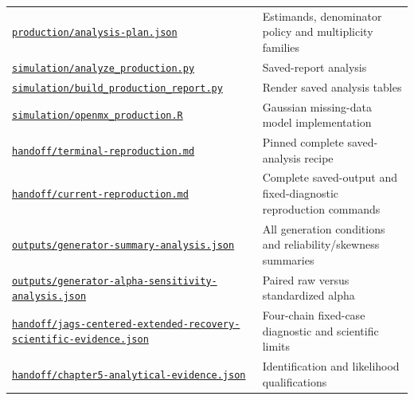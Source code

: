 \documentclass[11pt]{article}
\begin{document}
\begin{longtable}{p{225pt}p{220pt}}
\href{https://github.com/alectionary/vibe-math/blob/master/formalization/schwabe-psychometric-genetics/production/analysis-plan.json}{\nolinkurl{production/analysis-plan.json}} & Estimands, denominator policy and multiplicity families\\
\href{https://github.com/alectionary/vibe-math/blob/master/formalization/schwabe-psychometric-genetics/simulation/analyze_production.py}{\nolinkurl{simulation/analyze_production.py}} & Saved-report analysis\\
\href{https://github.com/alectionary/vibe-math/blob/master/formalization/schwabe-psychometric-genetics/simulation/build_production_report.py}{\nolinkurl{simulation/build_production_report.py}} & Render saved analysis tables\\
\href{https://github.com/alectionary/vibe-math/blob/master/formalization/schwabe-psychometric-genetics/simulation/openmx_production.R}{\nolinkurl{simulation/openmx_production.R}} & Gaussian missing-data model implementation\\
\href{https://github.com/alectionary/vibe-math/blob/master/formalization/schwabe-psychometric-genetics/handoff/terminal-reproduction.md}{\nolinkurl{handoff/terminal-reproduction.md}} & Pinned complete saved-analysis recipe\\
\href{https://github.com/alectionary/vibe-math/blob/master/formalization/schwabe-psychometric-genetics/handoff/current-reproduction.md}{\nolinkurl{handoff/current-reproduction.md}} & Complete saved-output and fixed-diagnostic reproduction commands\\
\href{https://github.com/alectionary/vibe-math/blob/master/formalization/schwabe-psychometric-genetics/outputs/generator-summary-analysis.json}{\nolinkurl{outputs/generator-summary-analysis.json}} & All generation conditions and reliability/skewness summaries\\
\href{https://github.com/alectionary/vibe-math/blob/master/formalization/schwabe-psychometric-genetics/outputs/generator-alpha-sensitivity-analysis.json}{\nolinkurl{outputs/generator-alpha-sensitivity-analysis.json}} & Paired raw versus standardized alpha\\
\href{https://github.com/alectionary/vibe-math/blob/master/formalization/schwabe-psychometric-genetics/handoff/jags-centered-extended-recovery-scientific-evidence.json}{\nolinkurl{handoff/jags-centered-extended-recovery-scientific-evidence.json}} & Four-chain fixed-case diagnostic and scientific limits\\
\href{https://github.com/alectionary/vibe-math/blob/master/formalization/schwabe-psychometric-genetics/handoff/chapter5-analytical-evidence.json}{\nolinkurl{handoff/chapter5-analytical-evidence.json}} & Identification and likelihood qualifications\\

\end{longtable}
\end{document}
